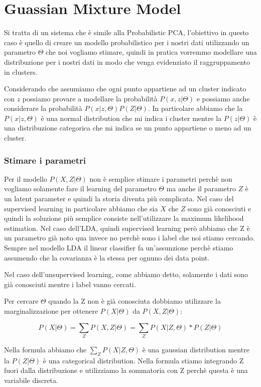 \documentclass[14pt]{extreport}
\begin{document}
\section{Guassian Mixture Model}

Si tratta di un sistema che è simile alla Probabilistic PCA, l'obiettivo in questo caso è quello di creare un modello probabilistico per i nostri dati
utilizzando un parametro $\Theta$ che noi vogliamo stimare, quindi in pratica vorremmo modellare una distribuzione per i nostri dati in modo che venga
evidenziato il raggruppamento in clusters.

Considerando che assumiamo che ogni punto appartiene ad un cluster indicato con $z$ possiamo provare a modellare la probabilità $P(x,z | \Theta)$ e
possiamo anche considerare la probabilità $P(x|z,\Theta)P(Z|\Theta)$. In particolare abbiamo che la $P(x|z,\Theta)$ è una normal distribution che mi
indica i cluster mentre la $P(z|\Theta)$ è una distribuzione categorica che mi indica se un punto appartiene o meno ad un cluster.

\subsubsection{Stimare i parametri}

Per il modello $P(X, Z | \Theta)$ non è semplice stimare i parametri perchè non vogliamo solamente fare il learning del parametro $\Theta$ ma anche il
parametro $Z$ è un latent parameter e quindi la storia diventa più complicata. Nel caso del supervised learning in particolare abbiamo che sia $X$ che
$Z$ sono già conosciuti e quindi la soluzione più semplice consiste nell'utilizzare la maximum likelihood estimation. Nel caso dell'LDA, quindi
supervised learning però abbiamo che Z è un parametro già noto qua invece no perchè sono i label che noi stiamo cercando. Sempre nel modello LDA il
linear classifier fa un'assunzione perchè stiamo assumendo che la covarianza è la stessa per ognuno dei data point.

Nel caso dell'unsupervised learning, come abbiamo detto, solamente i dati sono già conosciuti mentre i label vanno cercati.

Per cercare $\Theta$ quando la Z non è già conosciuta dobbiamo utilizzare la marginalizzazione per ottenere $P(X|\Theta)$ da $P(X,Z|\Theta)$:

$$ P(X | \Theta ) = \sum_{Z}{P(X , Z | \Theta )} = \sum_{Z} P(X | Z, \Theta ) * P( Z | \Theta) $$

Nella formula abbiamo che $\sum_{Z} P(X | Z, \Theta)$ è una gaussian distribution mentre la $P(Z | \Theta)$ è una categorical distribution. Nella
formula stiamo integrando Z fuori dalla distribuzione e utilizziamo la sommatoria con Z perchè questa è una variabile discreta.
\end{document}
